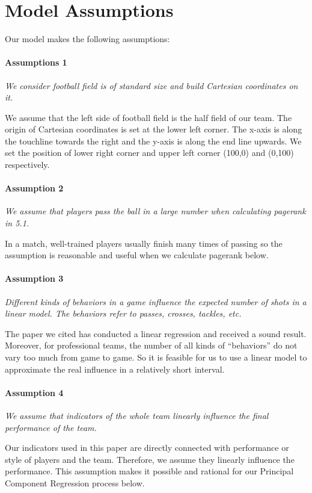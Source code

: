 \documentclass[12pt]{mcmthesis}
\begin{document}
\section{Model Assumptions}
Our model makes the following assumptions:
\paragraph{Assumptions 1}
	\textit{We consider football field is of standard size and build Cartesian coordinates on it.}
	
	We assume that the left side of football field is the half field of our team. The origin of Cartesian coordinates is set at the lower left corner. The x-axis is along the touchline towards the right and the y-axis is along the end line upwards. We set the position of lower right corner and upper left corner (100,0) and (0,100) respectively.
\paragraph{Assumption 2}
	\textit{We assume that players pass the ball in a large number when calculating pagerank in 5.1.}
	
	In a match, well-trained players usually finish many times of passing so the assumption is reasonable and useful when we calculate pagerank below.
\paragraph{Assumption 3}
	\textit{Different kinds of behaviors in a game influence the expected number of shots in a linear model. The behaviors refer to passes, crosses, tackles, etc.} 
	
	The paper we cited has conducted a linear regression and received a sound result. Moreover, for professional teams, the number of all kinds of “behaviors” do not vary too much from game to game. So it is feasible for us to use a linear model to approximate the real influence in a relatively short interval.
\paragraph{Assumption 4}
	\textit{We assume that indicators of the whole team linearly influence the final performance of the team.}
	
	Our indicators used in this paper are directly connected with performance or style of players and the team. Therefore, we assume they linearly influence the performance. This assumption makes it possible and rational for our Principal Component Regression process below.
\end{document}
